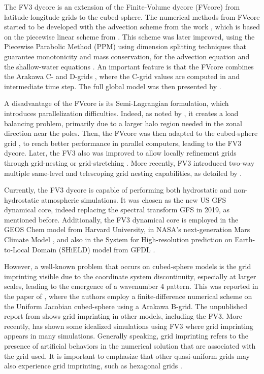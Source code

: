 The FV3 dycore is an extension of the Finite-Volume dycore (FVcore)
from latitude-longitude grids to the cubed-sphere.
The numerical methods from FVcore started to be developed with the advection scheme from the work \citet{lin:1994},
which is based on the piecewise linear scheme from \citet{vanleer:1977}. 
This scheme was later improved, using the Piecewise Parabolic Method (PPM) \citep{colella:1984, carpenter:1990}
using dimension splitting techniques that guarantee monotonicity and mass conservation,
for the advection equation \citep{lin:1996} and the shallow-water equations \citep{lin:1997}. 
An important feature is that the FVcore combines the  Arakawa C- and D-grids \citep{arakawa:1977},
where the C-grid values are computed in and intermediate time step. 
The full global model was then presented by \citet{lin:2004}.

A disadvantage of the FVcore is its Semi-Lagrangian formulation, which introduces parallelization difficulties. 
Indeed, as noted by \citet{putman:2007}, it creates a load balancing problem, 
primarily due to a larger halo region needed in the zonal direction near the poles.
Then, the FVcore was then adapted to the cubed-sphere grid \citep{putmanthesis:2007, putman:2007}, 
to reach better performance in parallel computers, leading to the FV3 dycore.
Later, the FV3 also was improved to allow locally refinement grids 
through grid-nesting or grid-stretching \citep{harris:2013}.
More recently, FV3 introduced two-way multiple same-level and telescoping grid nesting capabilities, as detailed by \citet{mouallem:2022}.

Currently, the FV3 dycore is capable of performing both hydrostatic and non-hydrostatic atmospheric simulations. 
It was chosen as the new US GFS dynamical core, indeed replacing the spectral transform GFS in 2019, as mentioned before.
Additionally, the FV3 dynamical core is employed in the GEOS Chem model \citep{martin:2022} from Harvard University, 
in NASA’s next-generation Mars Climate Model \citep{wilson:2022}, 
and also in the System for High-resolution prediction on Earth-to-Local Domain (SHiELD) model from GFDL \citep{harris:2020}.

However, a well-known problem that occurs on cubed-sphere models
is the grid imprinting visible due to the coordinate system discontinuity, 
especially at larger scales, leading to the emergence of a wavenumber 4 pattern.
This was reported in the paper of \citet{rancic:2017}, where the authors employ a 
finite-difference numerical scheme on the Uniform Jacobian cubed-sphere using a Arakawa B-grid.
The unpublished report from \citet{whitaker:2015} shows grid imprinting in other models, including 
the FV3.
More recently, \citet{mouallem:2023} has shown some idealized simulations using FV3 where grid imprinting appears in many simulations.
Generally speaking, grid imprinting refers to the presence of artificial behaviors in the numerical solution that are associated with the grid used.
It is important to emphasize that other quasi-uniform grids may also experience grid imprinting, such as hexagonal grids \citep{weller:2012, peixoto:2013, peixoto:2016}.


